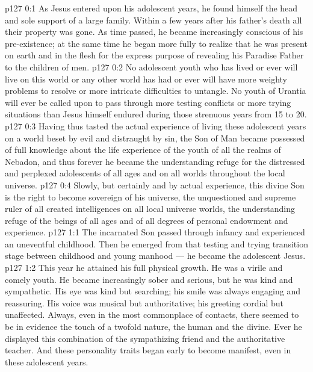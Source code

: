 \author{Midwayer Commission}
\vs p127 0:1 As Jesus entered upon his adolescent years, he found himself the head and sole support of a large family. Within a few years after his father’s death all their property was gone. As time passed, he became increasingly conscious of his pre\hyp{}existence; at the same time he began more fully to realize that he was present on earth and in the flesh for the express purpose of revealing his Paradise Father to the children of men.
\vs p127 0:2 No adolescent youth who has lived or ever will live on this world or any other world has had or ever will have more weighty problems to resolve or more intricate difficulties to untangle. No youth of Urantia will ever be called upon to pass through more testing conflicts or more trying situations than Jesus himself endured during those strenuous years from 15 to 20.
\vs p127 0:3 Having thus tasted the actual experience of living these adolescent years on a world beset by evil and distraught by sin, the Son of Man became possessed of full knowledge about the life experience of the youth of all the realms of Nebadon, and thus forever he became the understanding refuge for the distressed and perplexed adolescents of all ages and on all worlds throughout the local universe.
\vs p127 0:4 Slowly, but certainly and by actual experience, this divine Son is  the right to become sovereign of his universe, the unquestioned and supreme ruler of all created intelligences on all local universe worlds, the understanding refuge of the beings of all ages and of all degrees of personal endowment and experience.
\vs p127 1:1 The incarnated Son passed through infancy and experienced an uneventful childhood. Then he emerged from that testing and trying transition stage between childhood and young manhood --- he became the adolescent Jesus.
\vs p127 1:2 This year he attained his full physical growth. He was a virile and comely youth. He became increasingly sober and serious, but he was kind and sympathetic. His eye was kind but searching; his smile was always engaging and reassuring. His voice was musical but authoritative; his greeting cordial but unaffected. Always, even in the most commonplace of contacts, there seemed to be in evidence the touch of a twofold nature, the human and the divine. Ever he displayed this combination of the sympathizing friend and the authoritative teacher. And these personality traits began early to become manifest, even in these adolescent years.
